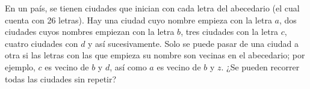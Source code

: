 En un país, se tienen ciudades que inician con cada letra del abecedario (el cual cuenta con 26 letras). Hay una ciudad cuyo nombre empieza con la letra $a$, dos ciudades cuyos nombres empiezan con la letra $b$, tres ciudades con la letra $c$, cuatro ciudades con $d$ y así sucesivamente. Solo se puede pasar de una ciudad a otra si las letras con las que empieza su nombre son vecinas en el abecedario; por ejemplo, $c$ es vecino de $b$ y $d$, así como $a$ es vecino de $b$ y $z$. ¿Se pueden recorrer todas las ciudades sin repetir?
